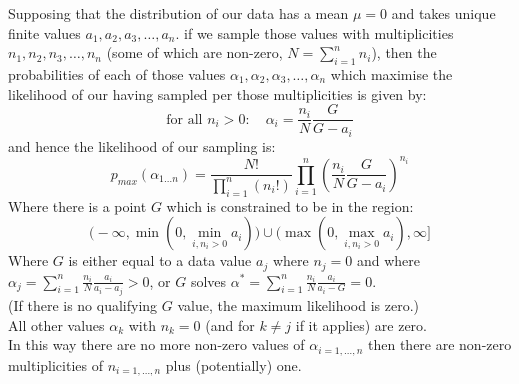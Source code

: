\documentclass[12pt]{colt2020} %
\begin{document}
\begin{theorem}\label{big_o_theorem}
Supposing that the distribution of our data has a mean $\mu=0$ and takes unique finite values $a_1,a_2,a_3,\dots,a_n$. if we sample those values with multiplicities $n_1,n_2,n_3,\dots,n_n$ (some of which are non-zero, $N = \sum_{i=1}^nn_i$), then the probabilities of each of those values $\alpha_1,\alpha_2,\alpha_3,\dots,\alpha_n$ which maximise the likelihood of our having sampled per those multiplicities is given by:
$$\mbox{for all }n_i>0:\quad \alpha_i = \frac{n_i}{N}\frac{G}{G-a_i} $$
and hence the likelihood of our sampling is:
$$p_{max}(\alpha_{1\dots n}) = \frac{N!}{\prod_{i=1}^n(n_i!)}\prod_{i=1}^n \left(\frac{n_i}{N}\frac{G}{G-a_i}\right)^{n_i}$$
Where there is a point $G$ which is constrained to be in the region:
$$\Big(-\infty,\min(0,\min_{i,n_i>0}a_i)\Big) \cup \Big(\max(0,\max_{i,n_i>0}a_i),\infty\Big]$$
Where $G$ is either equal to a data value $a_j$ where $n_j=0$ and where $\alpha_j = \sum_{i=1}^n\frac{n_i}{N}\frac{a_i}{a_i-a_j}>0$, or $G$ solves $\alpha^* = \sum_{i=1}^n\frac{n_i}{N}\frac{a_i}{a_i-G}=0$.\\
(If there is no qualifying $G$ value, the maximum likelihood is zero.)\\
All other values $\alpha_k$ with $n_k=0$ (and for $k\ne j$ if it applies) are zero.\\
In this way there are no more non-zero values of $\alpha_{i=1,\dots,n}$ then there are non-zero multiplicities of $n_{i=1,\dots,n}$ plus (potentially) one.
\end{theorem}
\end{document}
